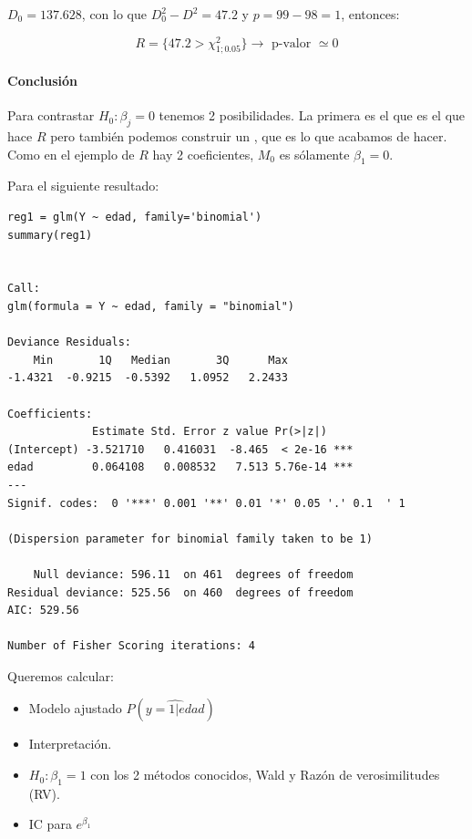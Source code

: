 $D_0 = 137.628$, con lo que $D_0^2 - D^2  = 47.2$ y $p = 99-98 = 1$, entonces:

\[
R = \{47.2 > \chi^2_{1;0.05}\}\to \text{ p-valor } \simeq 0
\]

\paragraph{Conclusión}

Para contrastar $H_0 : β_j = 0$ tenemos 2 posibilidades. La primera es el \label{test:Wald} que es el que hace $R$ pero también podemos construir un \label{test:RV}, que es lo que acabamos de hacer. Como en el ejemplo de $R$ hay 2 coeficientes, $M_0$ es sólamente $β_1 = 0$.


\begin{example}

Para el siguiente resultado:

\begin{lstlisting}[style=mystyle]
reg1 = glm(Y ~ edad, family='binomial')
summary(reg1)


Call:
glm(formula = Y ~ edad, family = "binomial")

Deviance Residuals: 
    Min       1Q   Median       3Q      Max  
-1.4321  -0.9215  -0.5392   1.0952   2.2433  

Coefficients:
             Estimate Std. Error z value Pr(>|z|)    
(Intercept) -3.521710   0.416031  -8.465  < 2e-16 ***
edad         0.064108   0.008532   7.513 5.76e-14 ***
---
Signif. codes:  0 '***' 0.001 '**' 0.01 '*' 0.05 '.' 0.1  ' 1 

(Dispersion parameter for binomial family taken to be 1)

    Null deviance: 596.11  on 461  degrees of freedom
Residual deviance: 525.56  on 460  degrees of freedom
AIC: 529.56

Number of Fisher Scoring iterations: 4
\end{lstlisting}




Queremos calcular:
\begin{itemize}
  \item Modelo ajustado $P(\hat{y=1 | edad})$
  \item Interpretación.
  \item $H_0 : β_1 = 1$ con los 2 métodos conocidos, Wald y Razón de verosimilitudes (RV).
  \item IC para $e^{β_1}$
\end{itemize}


\end{example}
